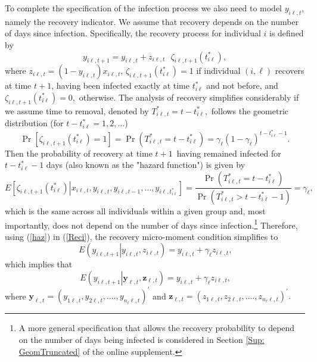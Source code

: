\documentclass[12pt]{article}
\begin{document}
To complete the specification of the infection process we also need to model
$y_{i\ell,t}$, namely the recovery indicator. We assume that recovery depends
on the number of days since infection. Specifically, the recovery process for
individual $i$ is defined by%
\begin{equation}
y_{i\ell,t+1}=y_{i\ell,t}+z_{i\ell,t}\text{ }\zeta_{i\ell,t+1}\left(
t_{i\ell}^{\ast}\right)  , \label{Reci}%
\end{equation}
where $z_{i\ell,t}=\left(  1-y_{i\ell,t}\right)  x_{i\ell,t}$, $\zeta
_{i\ell,t+1}\left(  t_{i\ell}^{\ast}\right)  =1$ if individual $\left(
i,\ell\right)  $ recovers at time $t+1$, having been infected exactly at time
$t_{i\ell}^{\ast}$ and not before, and $\zeta_{i\ell,t+1}\left(  t_{i\ell
}^{\ast}\right)  =0,$ otherwise. The analysis of recovery simplifies
considerably if we assume time to removal, denoted by $T_{i\ell,t}^{\ast
}=t-t_{i\ell}^{\ast},$ follows the geometric distribution (for $t-t_{i\ell
}^{\ast}=1,2,\ldots$)%
\begin{equation}
\Pr\left[  \zeta_{i\ell,t+1}\left(  t_{i\ell}^{\ast}\right)  =1\right]
=\Pr\left(  T_{i\ell,t}^{\ast}=t-t_{i\ell}^{\ast}\right)  =\gamma_{\ell
}\left(  1-\gamma_{\ell}\right)  ^{t-t_{i\ell}^{\ast}-1}. \label{Pr_Tstar}%
\end{equation}
Then the probability of recovery at time $t+1$\ having remained infected for
$t-t_{i\ell}^{\ast}-1$ days (also known as the "hazard function") is given by
\begin{equation}
E\left[  \zeta_{i\ell,t+1}\left(  t_{i\ell}^{\ast}\right)  \left\vert
x_{i\ell,t},y_{i\ell,t},y_{i\ell,t-1},\ldots,y_{i\ell,t_{i\ell}^{\ast}%
}\right.  \right]  =\frac{\Pr\left(  T_{i\ell,t}^{\ast}=t-t_{i\ell}^{\ast
}\right)  }{\Pr\left(  T_{i\ell,t}^{\ast}>t-t_{i\ell}^{\ast}-1\right)
}=\gamma_{\ell}, \label{haz}%
\end{equation}
which is the same across all individuals within a given group and, most
importantly, does not depend on the number of days since infection.\footnote{A
more general specification that allows the recovery probability to depend on
the number of days being infected is considered in Section
\ref{Sup: GeomTruncated} of the online supplement.} Therefore, using
(\ref{haz}) in (\ref{Reci}), the recovery micro-moment condition simplifies to%
\begin{equation}
E\left(  y_{i\ell,t+1}\left\vert y_{i\ell,t},z_{i\ell,t}\right.  \right)
=y_{i\ell,t}+\gamma_{\ell}z_{i\ell,t}\text{,} \label{MomReci}%
\end{equation}
which implies that
\begin{equation}
E\left(  y_{i\ell,t+1}\left\vert \mathbf{y}_{\ell,t},\mathbf{z}_{\ell
,t}\right.  \right)  =y_{i\ell,t}+\gamma_{\ell}z_{i\ell,t}\text{,}
\label{MomReciB}%
\end{equation}
where $\mathbf{y}_{\ell,t}=(y_{1\ell,t},y_{2\ell,t},....,y_{n_{\ell}\ell
,t})^{\prime}$ and $\mathbf{z}_{\ell,t}=(z_{1\ell,t},z_{2\ell,t}%
,....,z_{n_{\ell}\ell,t})^{\prime}.$
\end{document}
